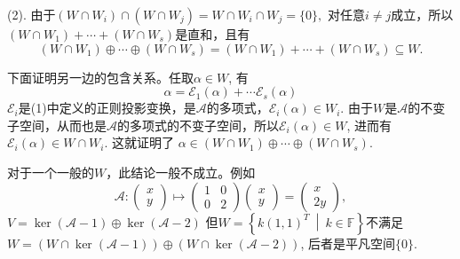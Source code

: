 {(2). 由于$(W\cap W_i) \cap (W\cap W_j) = W \cap W_i \cap W_j = \{0\},$ 对任意$i\neq j$成立，所以$(W \cap W_1) +\cdots+ (W \cap W_s)$是直和，且有
$$(W \cap W_1) \oplus\cdots\oplus (W \cap W_s) = (W \cap W_1) +\cdots+ (W \cap W_s) \subseteq W.$$

下面证明另一边的包含关系。任取$\alpha \in W$, 有
$$\alpha = \mathscr{E}_1(\alpha) + \cdots \mathscr{E}_s(\alpha)$$
$\mathscr{E}_i$是(1)中定义的正则投影变换，是$\mathscr{A}$的多项式，$\mathscr{E}_i(\alpha) \in W_i$. 由于$W$是$\mathscr{A}$的不变子空间，从而也是$\mathscr{A}$的多项式的不变子空间，所以$\mathscr{E}_i(\alpha) \in W$, 进而有$\mathscr{E}_i(\alpha) \in W\cap W_i$. 这就证明了
$\alpha \in (W \cap W_1) \oplus\cdots\oplus (W \cap W_s)$.

对于一个一般的$W$，此结论一般不成立。例如
$$\mathscr{A}: \begin{pmatrix} x \\ y \end{pmatrix} \mapsto \begin{pmatrix} 1 & 0 \\ 0 & 2 \end{pmatrix} \begin{pmatrix} x \\ y \end{pmatrix} = \begin{pmatrix} x \\ 2y \end{pmatrix},$$
$V = \ker (\mathscr{A} - 1) \oplus \ker (\mathscr{A} - 2)$
但$W = \left\{ k(1,1)^T \ \middle|\ k\in\mathbb{F} \right\}$不满足
$W = (W \cap \ker (\mathscr{A} - 1)) \oplus (W \cap \ker (\mathscr{A} - 2))$, 后者是平凡空间$\{0\}$.


}
